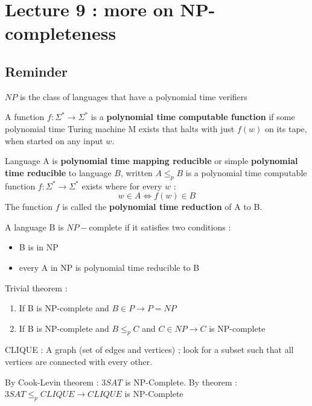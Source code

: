 \documentclass[12pt,a4paper]{article}
\newcommand{\<}{\langle}
\renewcommand{\>}{\rangle}
\begin{document}
\section{Lecture 9 : more on NP-completeness}
\subsection{Reminder}
\begin{blackbox}
    $NP$ is the class of languages that have a polynomial time verifiers
\end{blackbox}
\begin{blackbox}
    
\end{blackbox}
\begin{blackbox}
    A function $f:\Sigma^* \to \Sigma^*$ is a \textbf{polynomial time computable function} if some polynomial time Turing machine M exists that halts with just $f(w)$ on its tape, when started on any input $w$.
\end{blackbox}
\begin{blackbox}
    Language A is \textbf{polynomial time mapping reducible} or simple \textbf{polynomial time reducible} to language $B$, written $A \leq_p B$ is a polynomial time computable function $f : \Sigma^* \to \Sigma^*$ exists where for every $w$ :
    \[w \in A \iff f(w) \in B\]
    The function $f$ is called the \textbf{polynomial time reduction} of A to B.
\end{blackbox}
\begin{boite}
    A language B is $NP-$complete if it satisfies two conditions :
    \begin{itemize}
        \item B is in NP
        \item every A in NP is polynomial time reducible to B
    \end{itemize}
\end{boite}

Trivial theorem :
\begin{enumerate}
    \item If B is NP-complete and $B \in P \to P = NP$
    \item If B is NP-complete and $B \leq_p C$ and $C \in NP \to C$ is NP-complete
\end{enumerate}
CLIQUE : A graph (set of edges and vertices) ; look for a subset such that all vertices are connected with every other.

 By Cook-Levin theorem : $3SAT$ is NP-Complete. By theorem : $3SAT \leq_p CLIQUE \to CLIQUE$ is NP-Complete 
\end{document}
